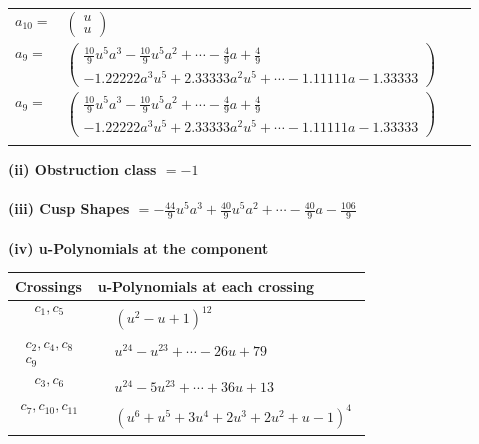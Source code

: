 \documentclass[1p]{elsarticle_modified}
\theoremstyle{definition}
\begin{document}
\begin{tabular}{m{7pt} m{180pt} m{7pt} m{180pt} }
\flushright $a_{10}=$&$\begin{pmatrix}u\\u\end{pmatrix}$ \\
\flushright $a_{9}=$&$\begin{pmatrix}\frac{10}{9} u^5 a^3-\frac{10}{9} u^5 a^2+\cdots-\frac{4}{9} a+\frac{4}{9}\\-1.22222 a^{3} u^{5}+2.33333 a^{2} u^{5}+\cdots-1.11111 a-1.33333\end{pmatrix}$\\ \flushright $a_{9}=$&$\begin{pmatrix}\frac{10}{9} u^5 a^3-\frac{10}{9} u^5 a^2+\cdots-\frac{4}{9} a+\frac{4}{9}\\-1.22222 a^{3} u^{5}+2.33333 a^{2} u^{5}+\cdots-1.11111 a-1.33333\end{pmatrix}$\\&\end{tabular}
\flushleft \textbf{(ii) Obstruction class $= -1$}\\~\\
\flushleft \textbf{(iii) Cusp Shapes $= -\frac{44}{9} u^5 a^3+\frac{40}{9} u^5 a^2+\cdots-\frac{40}{9} a-\frac{106}{9}$}\\~\\
\newpage\renewcommand{\arraystretch}{1}
\flushleft \textbf{(iv) u-Polynomials at the component}\newline \\
\begin{tabular}{m{50pt}|m{274pt}}
Crossings & \hspace{64pt}u-Polynomials at each crossing \\
\hline $$\begin{aligned}c_{1},c_{5}\end{aligned}$$&$\begin{aligned}
&(u^2- u+1)^{12}
\end{aligned}$\\
\hline $$\begin{aligned}c_{2},c_{4},c_{8}\\c_{9}\end{aligned}$$&$\begin{aligned}
&u^{24}- u^{23}+\cdots-26 u+79
\end{aligned}$\\
\hline $$\begin{aligned}c_{3},c_{6}\end{aligned}$$&$\begin{aligned}
&u^{24}-5 u^{23}+\cdots+36 u+13
\end{aligned}$\\
\hline $$\begin{aligned}c_{7},c_{10},c_{11}\end{aligned}$$&$\begin{aligned}
&(u^6+u^5+3 u^4+2 u^3+2 u^2+u-1)^4
\end{aligned}$\\
\hline
\end{tabular}\\~\\
\end{document}
